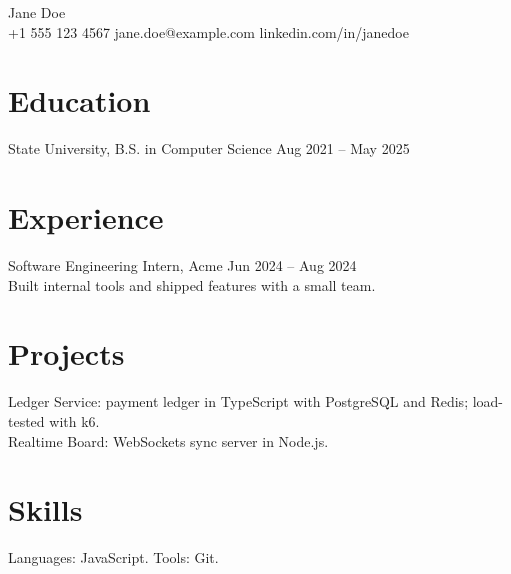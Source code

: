 \documentclass[10pt]{article}
\begin{document}
\begin{center}{\Large Jane Doe}\\ +1 555 123 4567 \quad jane.doe@example.com \quad linkedin.com/in/janedoe\end{center}
\section*{Education}
State University, B.S. in Computer Science \hfill Aug 2021 -- May 2025
\section*{Experience}
Software Engineering Intern, Acme \hfill Jun 2024 -- Aug 2024\\
Built internal tools and shipped features with a small team.
\section*{Projects}
Ledger Service: payment ledger in TypeScript with PostgreSQL and Redis; load-tested with k6.\\
Realtime Board: WebSockets sync server in Node.js.
\section*{Skills}
Languages: JavaScript. Tools: Git.
\end{document}
